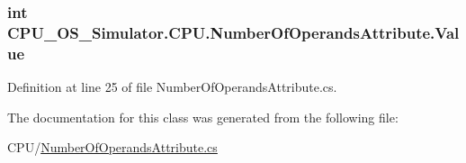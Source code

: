 \subsubsection[{Value}]{\setlength{\rightskip}{0pt plus 5cm}int C\+P\+U\+\_\+\+O\+S\+\_\+\+Simulator.\+C\+P\+U.\+Number\+Of\+Operands\+Attribute.\+Value\hspace{0.3cm}{\ttfamily [get]}}\label{class_c_p_u___o_s___simulator_1_1_c_p_u_1_1_number_of_operands_attribute_a00873634b211bcf2fd8b1425aa5143d6}


Definition at line 25 of file Number\+Of\+Operands\+Attribute.\+cs.



The documentation for this class was generated from the following file\+:\begin{DoxyCompactItemize}
\item 
C\+P\+U/\hyperlink{_number_of_operands_attribute_8cs}{Number\+Of\+Operands\+Attribute.\+cs}\end{DoxyCompactItemize}
